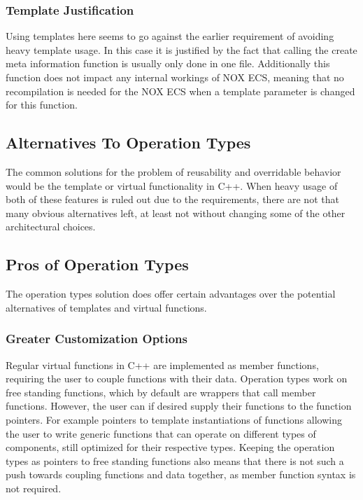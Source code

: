 

\subsubsection{Template Justification}
Using templates here seems to go against the earlier requirement of avoiding heavy template usage.
In this case it is justified by the fact that calling the create meta information function is usually only done in one file.
Additionally this function does not impact any internal workings of NOX ECS, meaning that no recompilation is needed for the NOX ECS when
a template parameter is changed for this function.

\subsection{Alternatives To Operation Types}
The common solutions for the problem of reusability and overridable behavior would be the template or virtual functionality in C++.
When heavy usage of both of these features is ruled out due to the requirements, there are not that many obvious alternatives left, at least not without changing some of the other architectural choices.

\subsection{Pros of Operation Types}
The operation types solution does offer certain advantages over the potential alternatives of templates and virtual functions.

\subsubsection{Greater Customization Options}
Regular virtual functions in C++ are implemented as member functions, requiring the user to couple functions with their data.
Operation types work on free standing functions, which by default are wrappers that call member functions.
However, the user can if desired supply their functions to the function pointers.
For example pointers to template instantiations of functions allowing the user to write generic functions that can operate on different types of components, still optimized for their respective types.
Keeping the operation types as pointers to free standing functions also means that there is not such a push towards coupling functions and data together, as member function syntax is not required.

